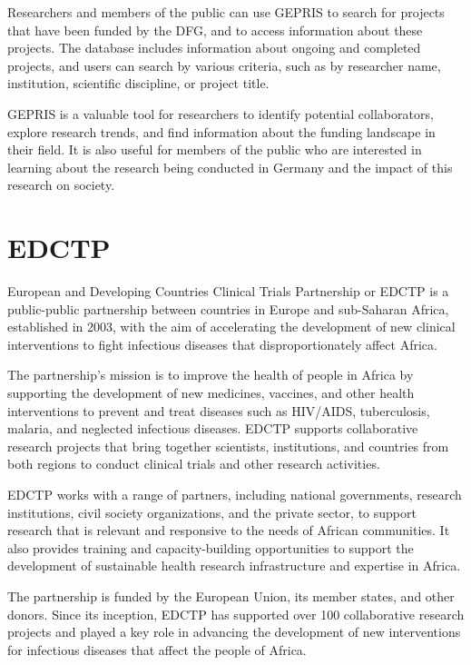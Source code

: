 \documentclass[
]{book}
\begin{document}
Researchers and members of the public can use GEPRIS to search for projects that have been funded by the DFG, and to access information about these projects. The database includes information about ongoing and completed projects, and users can search by various criteria, such as by researcher name, institution, scientific discipline, or project title.

GEPRIS is a valuable tool for researchers to identify potential collaborators, explore research trends, and find information about the funding landscape in their field. It is also useful for members of the public who are interested in learning about the research being conducted in Germany and the impact of this research on society.

\hypertarget{edctp}{%
\section{EDCTP}\label{edctp}}

European and Developing Countries Clinical Trials Partnership or EDCTP is a public-public partnership between countries in Europe and sub-Saharan Africa, established in 2003, with the aim of accelerating the development of new clinical interventions to fight infectious diseases that disproportionately affect Africa.

The partnership's mission is to improve the health of people in Africa by supporting the development of new medicines, vaccines, and other health interventions to prevent and treat diseases such as HIV/AIDS, tuberculosis, malaria, and neglected infectious diseases. EDCTP supports collaborative research projects that bring together scientists, institutions, and countries from both regions to conduct clinical trials and other research activities.

EDCTP works with a range of partners, including national governments, research institutions, civil society organizations, and the private sector, to support research that is relevant and responsive to the needs of African communities. It also provides training and capacity-building opportunities to support the development of sustainable health research infrastructure and expertise in Africa.

The partnership is funded by the European Union, its member states, and other donors. Since its inception, EDCTP has supported over 100 collaborative research projects and played a key role in advancing the development of new interventions for infectious diseases that affect the people of Africa.
\end{document}
